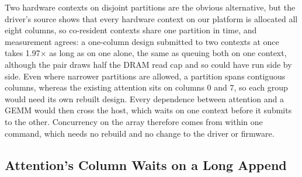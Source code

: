Two hardware contexts on disjoint partitions are the obvious alternative, but the driver's source shows that every hardware context on our platform is allocated all eight columns, so co-resident contexts share one partition in time, and measurement agrees: a one-column design submitted to two contexts at once takes 1.97$\times$ as long as on one alone, the same as queuing both on one context, although the pair draws half the DRAM read cap and so could have run side by side.
Even where narrower partitions are allowed, a partition spans contiguous columns, whereas the existing attention sits on columns 0 and 7, so each group would need its own rebuilt design.
Every dependence between attention and a GEMM would then cross the host, which waits on one context before it submits to the other.
Concurrency on the array therefore comes from within one command, which needs no rebuild and no change to the driver or firmware.

\subsection{Attention's Column Waits on a Long Append}
\label{app:append-waits}

